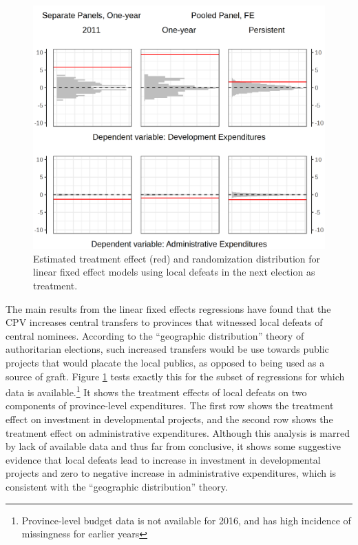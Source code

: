 \documentclass[12pt]{article}\usepackage[]{graphicx}\usepackage[]{color}
\newcommand{\1}{\mathbbm{1}}
\begin{document}
\begin{figure}[!htbp]
	\centering
	\includegraphics[width=\textwidth]{figure/SYP_FE_MECH.png}
	\captionsetup{singlelinecheck=off}
	\caption[Estimated effects of future treatment]{Estimated treatment effect (red) and randomization distribution for linear fixed effect models using local defeats in the next election as treatment.}
	\label{fig:Mech}
\end{figure}

The main results from the linear fixed effects regressions have found that the CPV increases central transfers to provinces that witnessed local defeats of central nominees. According to the ``geographic distribution'' theory of authoritarian elections, such increased transfers would be use towards public projects that would placate the local publics, as opposed to being used as a source of graft. Figure \ref{fig:Mech} tests exactly this for the subset of regressions for which data is available.\footnote{Province-level budget data is not available for 2016, and has high incidence of missingness for earlier years} It shows the treatment effects of local defeats on two components of province-level expenditures. The first row shows the treatment effect on investment in developmental projects, and the second row shows the treatment effect on administrative expenditures. Although this analysis is marred by lack of available data and thus far from conclusive, it shows some suggestive evidence that local defeats lead to increase in investment in developmental projects and zero to negative increase in administrative expenditures, which is consistent with the ``geographic distribution'' theory.
\end{document}
